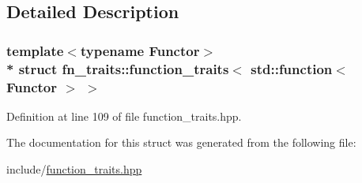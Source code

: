 \subsection{Detailed Description}
\subsubsection*{template$<$typename Functor$>$\\*
struct fn\+\_\+traits\+::function\+\_\+traits$<$ std\+::function$<$ Functor $>$ $>$}



Definition at line 109 of file function\+\_\+traits.\+hpp.



The documentation for this struct was generated from the following file\+:\begin{DoxyCompactItemize}
\item 
include/\hyperlink{function__traits_8hpp}{function\+\_\+traits.\+hpp}\end{DoxyCompactItemize}
